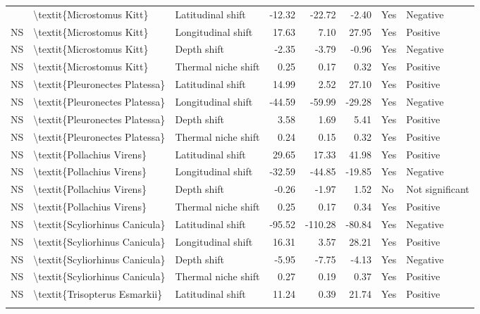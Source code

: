 \begin{longtable}[t]{lllrrrll}
{{NS & \textbackslash{}textit\{Microstomus Kitt\} & Latitudinal shift & -12.32 & -22.72 & -2.40 & Yes & Negative\\
\addlinespace
NS & \textbackslash{}textit\{Microstomus Kitt\} & Longitudinal shift & 17.63 & 7.10 & 27.95 & Yes & Positive\\
NS & \textbackslash{}textit\{Microstomus Kitt\} & Depth shift & -2.35 & -3.79 & -0.96 & Yes & Negative\\
NS & \textbackslash{}textit\{Microstomus Kitt\} & Thermal niche shift & 0.25 & 0.17 & 0.32 & Yes & Positive\\
NS & \textbackslash{}textit\{Pleuronectes Platessa\} & Latitudinal shift & 14.99 & 2.52 & 27.10 & Yes & Positive\\
NS & \textbackslash{}textit\{Pleuronectes Platessa\} & Longitudinal shift & -44.59 & -59.99 & -29.28 & Yes & Negative\\
\addlinespace
NS & \textbackslash{}textit\{Pleuronectes Platessa\} & Depth shift & 3.58 & 1.69 & 5.41 & Yes & Positive\\
NS & \textbackslash{}textit\{Pleuronectes Platessa\} & Thermal niche shift & 0.24 & 0.15 & 0.32 & Yes & Positive\\
NS & \textbackslash{}textit\{Pollachius Virens\} & Latitudinal shift & 29.65 & 17.33 & 41.98 & Yes & Positive\\
NS & \textbackslash{}textit\{Pollachius Virens\} & Longitudinal shift & -32.59 & -44.85 & -19.85 & Yes & Negative\\
NS & \textbackslash{}textit\{Pollachius Virens\} & Depth shift & -0.26 & -1.97 & 1.52 & No & Not significant\\
\addlinespace
NS & \textbackslash{}textit\{Pollachius Virens\} & Thermal niche shift & 0.25 & 0.17 & 0.34 & Yes & Positive\\
NS & \textbackslash{}textit\{Scyliorhinus Canicula\} & Latitudinal shift & -95.52 & -110.28 & -80.84 & Yes & Negative\\
NS & \textbackslash{}textit\{Scyliorhinus Canicula\} & Longitudinal shift & 16.31 & 3.57 & 28.21 & Yes & Positive\\
NS & \textbackslash{}textit\{Scyliorhinus Canicula\} & Depth shift & -5.95 & -7.75 & -4.13 & Yes & Negative\\
NS & \textbackslash{}textit\{Scyliorhinus Canicula\} & Thermal niche shift & 0.27 & 0.19 & 0.37 & Yes & Positive\\
\addlinespace
NS & \textbackslash{}textit\{Trisopterus Esmarkii\} & Latitudinal shift & 11.24 & 0.39 & 21.74 & Yes & Positive\\
}}
\end{longtable}
